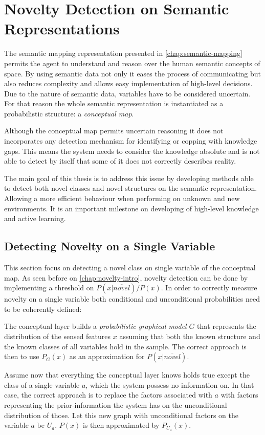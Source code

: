 \chapter{Novelty Detection on Semantic Representations}\label{chap:novelty}
The semantic mapping representation presented in \autoref{chap:semantic-mapping}
permits the agent to understand and reason over the human semantic concepts of
space. By using semantic data not only it eases the process of communicating 
but also reduces complexity and allows easy implementation of high-level
decisions.
Due to the nature of semantic data, variables have to be considered
uncertain. For that reason the whole semantic representation is instantiated
as a probabilistic structure: a \emph{conceptual map}. 

Although the conceptual map permits uncertain reasoning it does not incorporates
any detection mechanism for identifying or copping with knowledge gaps.
This means the system needs to consider the knowledge absolute and is not
able to detect by itself that some of it does not correctly describes reality. 

The main goal of this thesis is to address this issue by developing methods
able to detect both novel classes and novel structures on the semantic
representation. Allowing a more efficient behaviour when performing on unknown
and new environments. It is an important milestone on developing of high-level
knowledge and active learning.


\section{Detecting Novelty on a Single Variable}
This section focus on detecting a novel class on single variable of the
conceptual map. As seen before on \autoref{chap:novelty-intro},
novelty detection can be done by implementing a threshold on
$P(x|\overline{novel})/P(x)$.
In order to correctly measure novelty on a single variable both
conditional and unconditional probabilities need to be coherently defined:


The conceptual layer builds a \emph{probabilistic graphical model} $G$ that
represents the distribution of the sensed features $x$ assuming that both the
known structure and the known classes of all variables hold in the sample.
The correct approach is then to use $P_G(x)$ as an approximation for
$P(x|\overline{novel})$.

Assume now that everything the conceptual layer knows holds true except the
class of a single variable $a$, which the system possess no information on. 
In that case, the correct approach is to replace the factors associated with
$a$ with factors representing the prior-information the system has on
the unconditional distribution of those.
Let this new graph with unconditional factors on the variable
$a$ be $U_a$. $P(x)$ is then approximated by $P_{U_a}(x)$.

